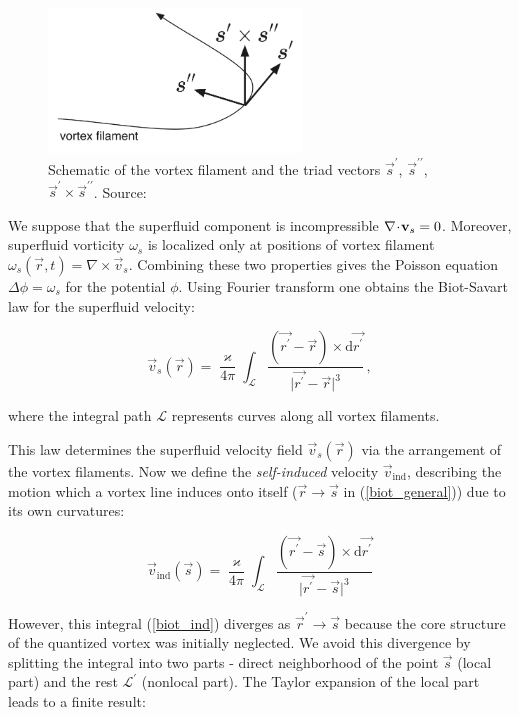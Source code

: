 \begin{figure}[h]
	\centering
	\includegraphics[width=0.6\textwidth]{graphics/theory/filament}
	\caption{Schematic of the vortex filament and the triad vectors $\vec{s}^{\prime}$, $\vec{s}^{\prime\prime}$, $\vec{s}^{\prime} \times \vec{s}^{\prime\prime}$. Source:\cite{tsubota}}
	\label{filament}
\end{figure}

We suppose that the superfluid component is incompressible $\nabla \!\cdot\! \mathbf{v}_s = 0$. Moreover, superfluid vorticity $\omega_s$ is localized only at positions of vortex filament $\omega_s(\vec{r},t) = \nabla \times \vec{v}_s$. Combining these two properties gives the Poisson equation $\Delta \phi = \omega_s$ for the potential $\phi$.
Using Fourier transform one obtains \cite{barenghi} the Biot-Savart law for the superfluid velocity:

\begin{equation}
\vec{v}_s(\vec{r}) = \frac{\varkappa}{4\pi} \int_{\mathcal{L}} \frac{(\vec{r^{\prime}} - \vec{r}) \times \text{d}\vec{r^{\prime}}}{\vert \vec{r^{\prime}} - \vec{r} \vert^3}\,,
\label{biot_general}
\end{equation}

where the integral path $\mathcal{L}$ represents curves along all vortex filaments.

This law determines the superfluid velocity field $\vec{v}_s(\vec{r})$ via the arrangement of the vortex filaments. Now we define the \textit{self-induced} velocity $\vec{v}_{\text{ind}}$, describing the motion which a vortex line induces onto itself ($\vec{r} \rightarrow \vec{s}$ in (\ref{biot_general})) due to its own curvatures:

\begin{equation}
\vec{v}_{\text{ind}}(\vec{s}) = \frac{\varkappa}{4\pi} \int_{\mathcal{L}} \frac{(\vec{r^{\prime}} - \vec{s}) \times \text{d}\vec{r^{\prime}}}{\vert \vec{r^{\prime}} - \vec{s} \vert^3}
\label{biot_ind}
\end{equation}

However, this integral (\ref{biot_ind}) diverges as $\vec{r}^{\prime} \rightarrow \vec{s}$ because the core structure
of the quantized vortex was initially neglected. We avoid this divergence by splitting the integral into two parts - direct neighborhood of the point $\vec{s}$ (local part) and the rest $\mathcal{L}^{\prime}$ (nonlocal part). The Taylor expansion of the local part leads \cite{schwarz} to a finite result:

